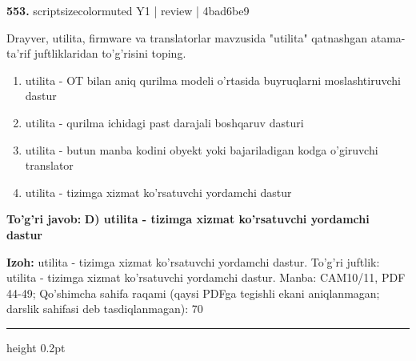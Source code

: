 \documentclass[10pt,a4paper]{article}
\begin{document}
{\bfseries\sffamily\color{ink} 553.} {scriptsizecolor{muted} Y1 | review | 4bad6be9}
\par
Drayver, utilita, firmware va translatorlar mavzusida "utilita" qatnashgan atama-ta'rif juftliklaridan to'g'risini toping.
\begin{enumerate}[label=\Alph*),leftmargin=9mm]
\item utilita - OT bilan aniq qurilma modeli o'rtasida buyruqlarni moslashtiruvchi dastur
\item utilita - qurilma ichidagi past darajali boshqaruv dasturi
\item utilita - butun manba kodini obyekt yoki bajariladigan kodga o'giruvchi translator
\item utilita - tizimga xizmat ko'rsatuvchi yordamchi dastur
\end{enumerate}
\begin{tcolorbox}[enhanced,breakable,colback=teal!4,colframe=teal!60!black,boxrule=0.45pt,arc=1.2mm,left=2.7mm,right=2.7mm,top=1.8mm,bottom=1.8mm,before skip=2mm,after skip=2mm]
{\bfseries\sffamily\color{teal}To'g'ri javob:} \textbf{D) utilita - tizimga xizmat ko'rsatuvchi yordamchi dastur}
\par\smallskip
{\bfseries Izoh:} utilita - tizimga xizmat ko'rsatuvchi yordamchi dastur. To'g'ri juftlik: utilita - tizimga xizmat ko'rsatuvchi yordamchi dastur. Manba: CAM10/11, PDF 44-49; Qo'shimcha sahifa raqami (qaysi PDFga tegishli ekani aniqlanmagan; darslik sahifasi deb tasdiqlanmagan): 70
\end{tcolorbox}
\vspace{2mm}\hrule height 0.2pt\vspace{3mm}
\end{document}
